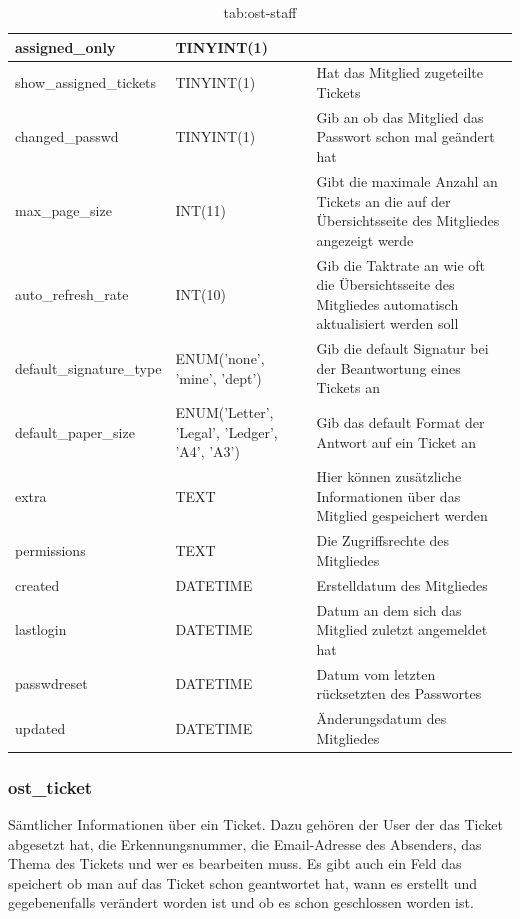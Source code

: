 \begin{table}[]
\begin{tabular}{|p{3cm}|p{4cm}|p{7.7cm}|}
		\hline
		assigned\_only & TINYINT(1) & \\
		\hline
		show\_assigned\_tickets & TINYINT(1) & Hat das Mitglied zugeteilte Tickets \\
		\hline
		changed\_passwd & TINYINT(1) & Gib an ob das Mitglied das Passwort schon mal geändert hat\\
		\hline
		max\_page\_size & INT(11) & Gibt die maximale Anzahl an Tickets an die auf der Übersichtsseite des Mitgliedes angezeigt werde \\
		\hline
		auto\_refresh\_rate & INT(10) & Gib die Taktrate an wie oft die Übersichtsseite des Mitgliedes automatisch aktualisiert werden soll \\
		\hline
		default\_signature\_type & ENUM('none', 'mine', 'dept') & Gib die default Signatur bei der Beantwortung eines Tickets an \\
		\hline
		default\_paper\_size & ENUM('Letter', 'Legal', 'Ledger', 'A4', 'A3') & Gib das default Format der Antwort auf ein Ticket an \\
		\hline
		extra & TEXT & Hier können zusätzliche Informationen über das Mitglied gespeichert werden \\
		\hline
		permissions & TEXT & Die Zugriffsrechte des Mitgliedes \\
		\hline
		created & DATETIME & Erstelldatum des Mitgliedes \\
		\hline
		lastlogin & DATETIME & Datum an dem sich das Mitglied zuletzt angemeldet hat \\
		\hline
		passwdreset & DATETIME & Datum vom letzten rücksetzten des Passwortes \\
		\hline
		updated & DATETIME & Änderungsdatum des Mitgliedes \\
		\hline
	\end{tabular}
	\caption{tab:ost-staff}
\end{table}
\label{tab:ost_staff}


\newpage
\subsubsection{ost\_ticket}

Sämtlicher Informationen über ein Ticket. Dazu gehören der User der das Ticket abgesetzt hat, die Erkennungsnummer, die Email-Adresse des Absenders, das Thema des Tickets und wer es bearbeiten muss. Es gibt auch ein Feld das speichert ob man auf das Ticket schon geantwortet hat, wann es erstellt und gegebenenfalls verändert worden ist und ob es schon geschlossen worden ist.


